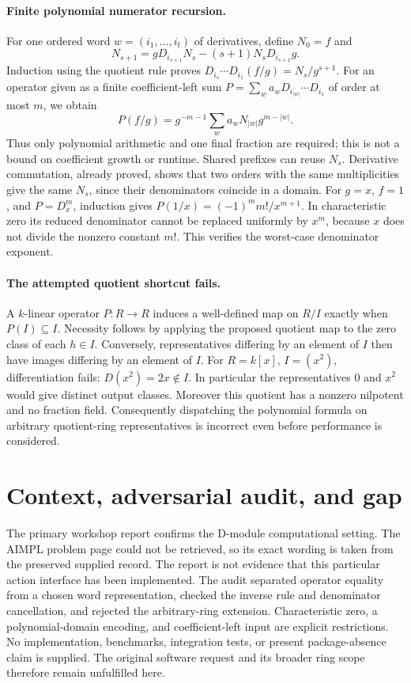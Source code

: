 \documentclass[11pt]{article}
\begin{document}
\paragraph{Finite polynomial numerator recursion.}
For one ordered word $w=(i_1,\ldots,i_t)$ of derivatives, define $N_0=f$ and
\[
N_{s+1}=gD_{i_{s+1}}N_s-(s+1)N_sD_{i_{s+1}}g.
\]
Induction using the quotient rule proves
$D_{i_s}\cdots D_{i_1}(f/g)=N_s/g^{s+1}$.
For an operator given as a finite coefficient-left sum
$P=\sum_w a_w D_{i_{|w|}}\cdots D_{i_1}$ of order at most $m$, we obtain
\[
P(f/g)=g^{-m-1}\sum_w a_w N_{|w|}g^{m-|w|}.
\]
Thus only polynomial arithmetic and one final fraction are required; this is
not a bound on coefficient growth or runtime. Shared prefixes can reuse $N_s$.
Derivative commutation, already proved, shows that two orders with the same
multiplicities give the same $N_s$, since their denominators coincide in a
domain. For $g=x$, $f=1$, and $P=D_x^m$, induction gives
$P(1/x)=(-1)^m m!/x^{m+1}$. In characteristic zero its reduced denominator
cannot be replaced uniformly by $x^m$, because $x$ does not divide the nonzero
constant $m!$. This verifies the worst-case denominator exponent.

\paragraph{The attempted quotient shortcut fails.}
A $k$-linear operator $P:R\to R$ induces a well-defined map on $R/I$ exactly
when $P(I)\subseteq I$. Necessity follows by applying the proposed quotient
map to the zero class of each $h\in I$. Conversely, representatives differing
by an element of $I$ then have images differing by an element of $I$.
For $R=k[x]$, $I=(x^2)$, differentiation fails: $D(x^2)=2x\notin I$.
In particular the representatives $0$ and $x^2$ would give distinct output
classes. Moreover this quotient has a nonzero nilpotent and no fraction field.
Consequently dispatching the polynomial formula on arbitrary quotient-ring
representatives is incorrect even before performance is considered.

\section{Context, adversarial audit, and gap}
The primary workshop report confirms the D-module computational setting.
The AIMPL problem page could not be retrieved, so its exact wording is taken
from the preserved supplied record. The report is not evidence that this
particular action interface has been implemented. The audit separated
operator equality from a chosen word representation, checked the inverse
rule and denominator cancellation, and rejected the arbitrary-ring extension.
Characteristic zero, a polynomial-domain encoding, and coefficient-left input
are explicit restrictions. No implementation, benchmarks, integration tests,
or present package-absence claim is supplied. The original software request
and its broader ring scope therefore remain unfulfilled here.
\end{document}
